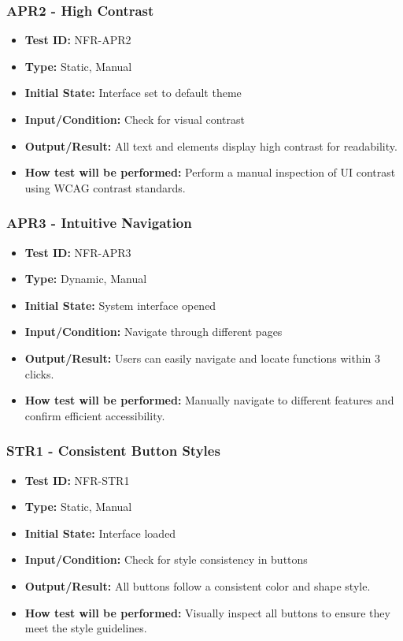 \documentclass[12pt, titlepage]{article}
\begin{document}
\subsubsection{APR2 - High Contrast}
\begin{itemize}
    \item \textbf{Test ID:} NFR-APR2
    \item \textbf{Type:} Static, Manual
    \item \textbf{Initial State:} Interface set to default theme
    \item \textbf{Input/Condition:} Check for visual contrast
    \item \textbf{Output/Result:} All text and elements display high contrast for readability.
    \item \textbf{How test will be performed:} Perform a manual inspection of UI contrast using WCAG contrast standards.
\end{itemize}

\subsubsection{APR3 - Intuitive Navigation}
\begin{itemize}
    \item \textbf{Test ID:} NFR-APR3
    \item \textbf{Type:} Dynamic, Manual
    \item \textbf{Initial State:} System interface opened
    \item \textbf{Input/Condition:} Navigate through different pages
    \item \textbf{Output/Result:} Users can easily navigate and locate functions within 3 clicks.
    \item \textbf{How test will be performed:} Manually navigate to different features and confirm efficient accessibility.
\end{itemize}

\subsubsection{STR1 - Consistent Button Styles}
\begin{itemize}
    \item \textbf{Test ID:} NFR-STR1
    \item \textbf{Type:} Static, Manual
    \item \textbf{Initial State:} Interface loaded
    \item \textbf{Input/Condition:} Check for style consistency in buttons
    \item \textbf{Output/Result:} All buttons follow a consistent color and shape style.
    \item \textbf{How test will be performed:} Visually inspect all buttons to ensure they meet the style guidelines.
\end{itemize}
\end{document}
